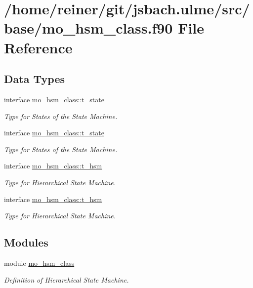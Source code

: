 \hypertarget{mo__hsm__class_8f90}{}\section{/home/reiner/git/jsbach.ulme/src/base/mo\+\_\+hsm\+\_\+class.f90 File Reference}
\label{mo__hsm__class_8f90}
\subsection*{Data Types}
\begin{DoxyCompactItemize}
\item 
interface \hyperlink{structmo__hsm__class_1_1t__state}{mo\+\_\+hsm\+\_\+class\+::t\+\_\+state}
\begin{DoxyCompactList}\small\item\em Type for States of the State Machine. \end{DoxyCompactList}\item 
interface \hyperlink{structmo__hsm__class_1_1t__state}{mo\+\_\+hsm\+\_\+class\+::t\+\_\+state}
\begin{DoxyCompactList}\small\item\em Type for States of the State Machine. \end{DoxyCompactList}\item 
interface \hyperlink{structmo__hsm__class_1_1t__hsm}{mo\+\_\+hsm\+\_\+class\+::t\+\_\+hsm}
\begin{DoxyCompactList}\small\item\em Type for Hierarchical State Machine. \end{DoxyCompactList}\item 
interface \hyperlink{structmo__hsm__class_1_1t__hsm}{mo\+\_\+hsm\+\_\+class\+::t\+\_\+hsm}
\begin{DoxyCompactList}\small\item\em Type for Hierarchical State Machine. \end{DoxyCompactList}\end{DoxyCompactItemize}
\subsection*{Modules}
\begin{DoxyCompactItemize}
\item 
module \hyperlink{namespacemo__hsm__class}{mo\+\_\+hsm\+\_\+class}
\begin{DoxyCompactList}\small\item\em Definition of Hierarchical State Machine. \end{DoxyCompactList}\end{DoxyCompactItemize}
